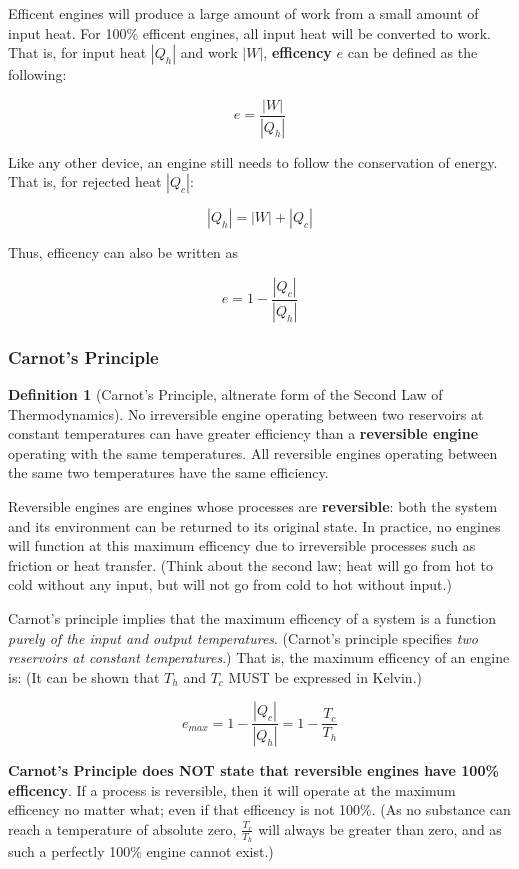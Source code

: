 \documentclass[12pt, a4paper]{article}
\theoremstyle{definition}
\newtheorem{definition}{Definition}
\begin{document}
Efficent engines will produce a large amount of work from a small amount of input heat.
For 100\% efficent engines, all input heat will be converted to work.
That is, for input heat $|Q_h|$ and work $|W|$, \textbf{efficency} $e$ can be defined as the following:

\[e = \frac{|W|}{|Q_h|}\]

Like any other device, an engine still needs to follow the conservation of energy.
That is, for rejected heat $|Q_c|$:

\[|Q_h| = |W| + |Q_c|\]

Thus, efficency can also be written as

\[e = 1 - \frac{|Q_c|}{|Q_h|}\]

\subsubsection{Carnot's Principle}
\begin{definition}[Carnot's Principle, altnerate form of the Second Law of Thermodynamics]
    No irreversible engine operating between two reservoirs at constant temperatures can have greater efficiency than a \textbf{reversible engine} operating with the same temperatures.
    All reversible engines operating between the same two temperatures have the same efficiency.
\end{definition}


Reversible engines are engines whose processes are \textbf{reversible}: both the system and its environment can be returned to its original state.
In practice, no engines will function at this maximum efficency due to irreversible processes such as friction or heat transfer.
(Think about the second law; heat will go from hot to cold without any input, but will not go from cold to hot without input.)

Carnot's principle implies that the maximum efficency of a system is a function \textit{purely of the input and output temperatures}.
(Carnot's principle specifies \textit{two reservoirs at constant temperatures}.)
That is, the maximum efficency of an engine is: (It can be shown that $T_h$ and $T_c$ MUST be expressed in Kelvin.)

\[e_{max} = 1 - \frac{|Q_c|}{|Q_h|} = 1 - \frac{T_c}{T_h}\]

\textbf{Carnot's Principle does NOT state that reversible engines have 100\% efficency}.
If a process is reversible, then it will operate at the maximum efficency no matter what; even if that efficency is not 100\%.
(As no substance can reach a temperature of absolute zero, $\frac{T_c}{T_h}$ will always be greater than zero, and as such a perfectly 100\% engine cannot exist.)
\end{document}
